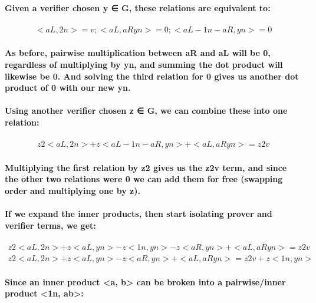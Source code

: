 \documentclass{article}
\begin{document}
\paragraph{Given a verifier chosen y ∈ G, these relations are equivalent to:}

\begin{eqnarray}
  <aL, 2n> = v ; <aL,  aRyn> = 0 ; <aL - 1n - aR, yn> = 0
\end{eqnarray}

\paragraph{As before, pairwise multiplication between aR and aL will be 0, regardless of multiplying by yn, and summing the dot product will likewise be 0. And solving the third relation for 0 gives us another dot product of 0 with our new yn.}

\paragraph{Using another verifier chosen z ∈ G, we can combine these into one relation:}

\begin{eqnarray}
  z2 <aL, 2n> + z <aL - 1n - aR, yn> + <aL,  aRyn> = z2 v
\end{eqnarray}

\paragraph{Multiplying the first relation by z2 gives us the z2v term, and since the other two relations were 0 we can add them for free (swapping order and multiplying one by z).}

\paragraph{If we expand the inner products, then start isolating prover and verifier terms, we get:}

\begin{eqnarray}
  z2 <aL, 2n> + z <aL, yn> - z <1n, yn> - z <aR, yn> + <aL,  aRyn> = z2 v\\
  z2 <aL, 2n> + z <aL, yn> - z <aR, yn> + <aL,  aRyn> = z2 v + z <1n, yn>
\end{eqnarray}

\paragraph{Since an inner product <a, b> can be broken into a pairwise/inner product <1n, ab>:}
\end{document}
